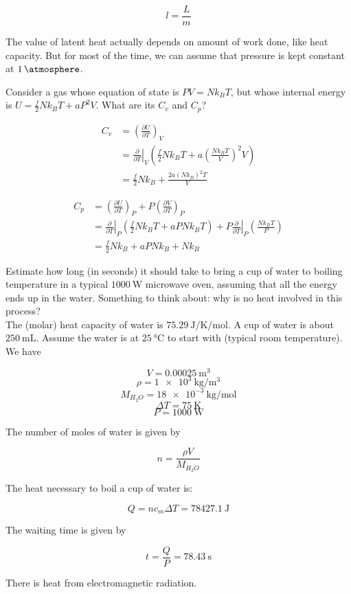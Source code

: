 \[l=\frac{L}{m}\]

The value of latent heat actually depends on amount of work done, like heat capacity. But for most of the time, we can assume that pressure is kept constant at $\SI{1}{\atmosphere}$.

\begin{texample}
	Consider a gas whose equation of state is $PV=Nk_BT$, but whose internal energy is $U=\frac{f}{2}Nk_BT+aP^2V$. What are its $C_v$ and $C_p$?
	
	\begin{align*}
		C_v&=\left( \frac{\partial U}{\partial T} \right)_V \\
		&=\left.\frac{\partial}{\partial T}\right\vert_V \left( \frac{f}{2}Nk_BT+a\left( \frac{Nk_BT}{V} \right)^2V \right) \\
		&=\frac{f}{2}Nk_B+\frac{2a(Nk_B)^2T}{V}
	\end{align*}
	
	\begin{align*}
		C_p&=\left( \frac{\partial U}{\partial T} \right)_P+P\left( \frac{\partial V}{\partial T} \right)_P \\
		&=\left.\frac{\partial}{\partial T}\right\vert_P \left( \frac{f}{2}Nk_BT+aPNk_BT \right)+P\left.\frac{\partial}{\partial T}\right\vert_P \left( \frac{Nk_BT}{P} \right) \\
		&=\frac{f}{2}Nk_B+aPNk_B+Nk_B
	\end{align*}
\end{texample}

\begin{texample}
	Estimate how long (in seconds) it should take to bring a cup of water to boiling temperature in a typical $\SI{1000}{\watt}$ microwave oven, assuming that all the energy ends up in the water. Something to think about: why is no heat involved in this process? \\
	
	The (molar) heat capacity of water is $\SI{75.29}{\joule\per\kelvin\per\mole}$. A cup of water is about $\SI{250}{\milli\liter}$. Assume the water is at $\SI{25}{\celsius}$ to start with (typical room temperature). \\
	
	We have
	
	\[V=\SI{0.00025}{\cubic\meter}\]
	\[\rho=\SI{1e3}{\kilo\gram\per\cubic\meter}\]
	\[M_{H_2O}=\SI{18e-3}{\kilo\gram\per\mole}\]
	\[\Delta T=\SI{75}{\kelvin}\]
	\[P=\SI{1000}{\watt}\]
	
	The number of moles of water is given by
	
	\[n=\frac{\rho V}{M_{H_2O}}\]
	
	The heat necessary to boil a cup of water is:
	
	\[Q=nc_m \Delta T=\SI{78427.1}{\joule}\]
	
	The waiting time is given by
	
	\[t=\frac{Q}{P}=\SI{78.43}{\second}\]
	
	There is heat from electromagnetic radiation.
\end{texample}

